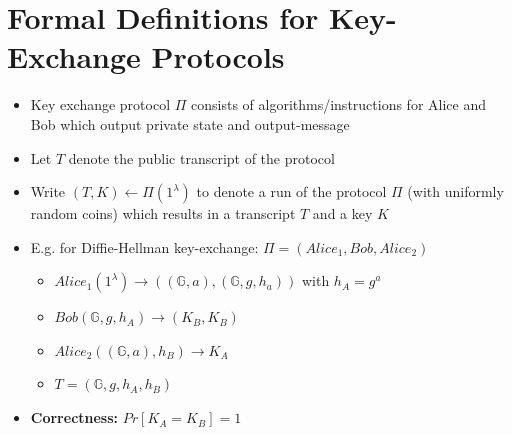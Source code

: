 \section{Formal Definitions for Key-Exchange Protocols}
	\begin{itemize}
		\item Key exchange protocol $\Pi$ consists of algorithms/instructions for Alice and Bob which output private state and output-message
		\item Let $T$ denote the public transcript of the protocol
		\item Write $(T,K) \leftarrow \Pi(1^{\lambda})$ to denote a run of the protocol $\Pi$ (with uniformly random coins) which results in a transcript $T$ and a key $K$
		\item E.g. for Diffie-Hellman key-exchange: $\Pi = (Alice_1, Bob, Alice_2)$
		\begin{itemize}
			\item $Alice_1(1^{\lambda}) \rightarrow ((\mathbb{G},a),(\mathbb{G},g,h_a))$ with $h_A = g^a$
			\item $Bob(\mathbb{G},g,h_A) \rightarrow (K_B,K_B)$
			\item $Alice_2 ((\mathbb{G},a),h_B) \rightarrow K_A$
			\item $T = (\mathbb{G},g,h_A,h_B)$
		\end{itemize}
		\item \textbf{Correctness:} $Pr[K_A = K_B] = 1$
	\end{itemize}


